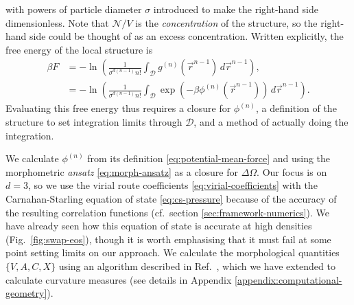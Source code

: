 \documentclass[11pt,twoside]{report}
\begin{document}
with powers of particle diameter $\sigma$ introduced to make the right-hand side dimensionless.
Note that $\mathcal{N} / V$ is the \emph{concentration} of the structure, so the right-hand side could be thought of as an excess concentration.
Written explicitly, the free energy of the local structure is
\begin{equation}\label{eq:local-structure-free-energy}
  \begin{split}
    \beta F
    &=
    -\ln{
      \left(
        \frac{1}{\sigma^{d(n-1)} n!}
        \int_{\mathcal{D}}
        g^{(n)}(\vec{r}^{n-1}) \, d\vec{r}^{n-1}
      \right)
    },
    \\
    &=
    -\ln{
      \left(
        \frac{1}{\sigma^{d(n-1)} n!}
        \int_{\mathcal{D}}
        \exp{\left(-\beta\phi^{(n)}(\vec{r}^{n-1})\right)}
        \, d\vec{r}^{n-1}
      \right)
    }.
  \end{split}
\end{equation}
Evaluating this free energy thus requires a closure for $\phi^{(n)}$, a definition of the structure to set integration limits through $\mathcal{D}$, and a method of actually doing the integration.

We calculate $\phi^{(n)}$ from its definition \eqref{eq:potential-mean-force} and using the morphometric \emph{ansatz} \eqref{eq:morph-ansatz} as a closure for $\Delta \Omega$.
Our focus is on $d=3$, so we use the virial route coefficients \eqref{eq:virial-coefficients} with the Carnahan-Starling equation of state \eqref{eq:cs-pressure} because of the accuracy of the resulting correlation functions (cf.\ section \ref{sec:framework-numerics}).
We have already seen how this equation of state is accurate at high densities (Fig.\ \ref{fig:swap-eos}), though it is worth emphasising that it must fail at some point setting limits on our approach.
We calculate the morphological quantities $\{V, A, C, X\}$ using an algorithm described in Ref.\ \cite{KleninJCC2011}, which we have extended to calculate curvature measures (see details in Appendix \ref{appendix:computational-geometry}).
\end{document}
